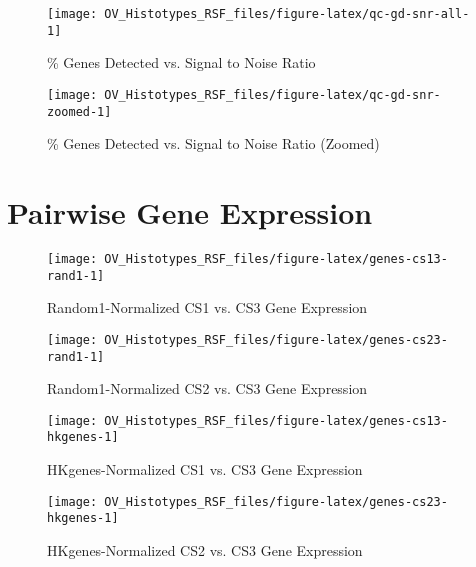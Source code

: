 \documentclass[
]{report}
\begin{document}
\begin{figure}[H]

{\centering \texttt{[image: OV\_Histotypes\_RSF\_files/figure-latex/qc-gd-snr-all-1]} 

}

\caption{\% Genes Detected vs. Signal to Noise Ratio}\label{fig:qc-gd-snr-all}
\end{figure}

\begin{figure}[H]

{\centering \texttt{[image: OV\_Histotypes\_RSF\_files/figure-latex/qc-gd-snr-zoomed-1]} 

}

\caption{\% Genes Detected vs. Signal to Noise Ratio (Zoomed)}\label{fig:qc-gd-snr-zoomed}
\end{figure}

\section{Pairwise Gene Expression}\label{pairwise-gene-expression}

\begin{figure}[H]

{\centering \texttt{[image: OV\_Histotypes\_RSF\_files/figure-latex/genes-cs13-rand1-1]} 

}

\caption{Random1-Normalized CS1 vs. CS3 Gene Expression}\label{fig:genes-cs13-rand1}
\end{figure}

\begin{figure}[H]

{\centering \texttt{[image: OV\_Histotypes\_RSF\_files/figure-latex/genes-cs23-rand1-1]} 

}

\caption{Random1-Normalized CS2 vs. CS3 Gene Expression}\label{fig:genes-cs23-rand1}
\end{figure}

\begin{figure}[H]

{\centering \texttt{[image: OV\_Histotypes\_RSF\_files/figure-latex/genes-cs13-hkgenes-1]} 

}

\caption{HKgenes-Normalized CS1 vs. CS3 Gene Expression}\label{fig:genes-cs13-hkgenes}
\end{figure}

\begin{figure}[H]

{\centering \texttt{[image: OV\_Histotypes\_RSF\_files/figure-latex/genes-cs23-hkgenes-1]} 

}

\caption{HKgenes-Normalized CS2 vs. CS3 Gene Expression}\label{fig:genes-cs23-hkgenes}
\end{figure}
\end{document}
